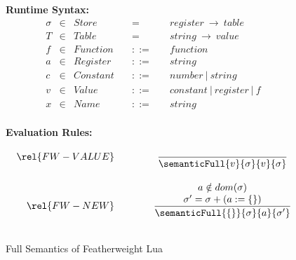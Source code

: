 \newcommand{\metaSemanticFull}[6]{{#1}, {#2}, {#3} \Downarrow {#4}, {#5}, {#6}}
\newcommand{\ssrule}[3]{
\rel{#1} &
\frac{\strut\begin{array}{@{}c@{}} #2 \end{array}}
{\strut\begin{array}{@{}c@{}} #3 \end{array}}
\\~\\
}
\begin{figure}[P]
\caption{Full Semantics of Featherweight Lua}
{\bf Runtime Syntax:}
\label{fig:FW2.1Sem}
\[
\begin{array}{rclcl}
\sigma & \in & {Store} \quad & = & \quad {register} ~\rightarrow ~{table} \\
T & \in & {Table} \quad & = & \quad {string} ~\rightarrow ~{value} \\
f & \in & {Function} \quad & ::= & \quad function \\
a & \in & {Register} \quad & ::= & \quad string~ \\
c & \in & {Constant} \quad & ::= & \quad number~|~string~ \\
v & \in & {Value} \quad & ::= & \quad constant~|~ register ~|~ f~ \\
x & \in & {Name} \quad & ::= & \quad string 
\\
\end{array}
\]

{\bf Evaluation Rules:~~~ } \\
\[
\begin{array}{r@{\qquad\qquad}c}
\ssrule{FW-VALUE}{
}{
\semanticFull {v}{\sigma} {v}{\sigma}
}
\ssrule{FW-NEW}{
a \notin dom(\sigma)\\
\sigma' = \sigma + (a := \{\})
}{
\semanticFull {\{\}} {\sigma} {a} {\sigma'}
}


\end{array}\]
\end{figure}
